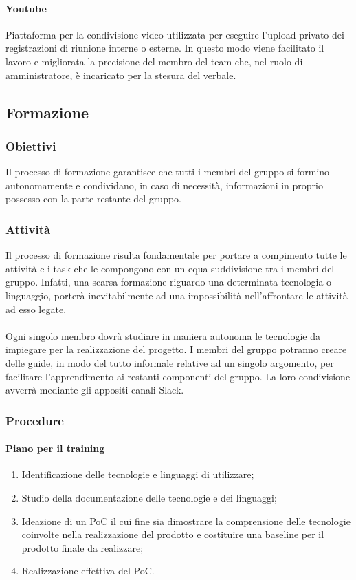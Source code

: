 	\paragraph{Youtube}
	Piattaforma per la condivisione video utilizzata per eseguire l'upload privato dei registrazioni di riunione interne o esterne. In questo modo viene facilitato il lavoro e migliorata la precisione del membro del team che, nel ruolo di amministratore, è incaricato per la stesura del verbale.


   	\subsection{Formazione}
	\subsubsection{Obiettivi}
	Il processo di formazione garantisce che tutti i membri del gruppo si formino autonomamente e condividano, in caso di necessità, informazioni in proprio possesso con la parte restante del gruppo.

	\subsubsection{Attività}
	Il processo di formazione risulta fondamentale per portare a compimento tutte le attività e i task che le compongono con un equa suddivisione tra i membri del gruppo. Infatti, una scarsa formazione riguardo una determinata tecnologia o linguaggio, porterà inevitabilmente ad una impossibilità nell'affrontare le attività ad esso legate.\\\\
	Ogni singolo membro dovrà studiare in maniera autonoma le tecnologie da impiegare per la realizzazione del progetto. I membri del gruppo potranno creare delle guide, in modo del tutto informale relative ad un singolo argomento, per facilitare l'apprendimento ai restanti componenti del gruppo. La loro condivisione avverrà mediante gli appositi canali Slack.

	\subsubsection{Procedure}
	\paragraph{Piano per il training}
	\begin{enumerate}
		\item Identificazione delle tecnologie e linguaggi di utilizzare;
		\item Studio della documentazione delle tecnologie e dei linguaggi;
		\item Ideazione di un PoC il cui fine sia dimostrare la comprensione delle tecnologie coinvolte nella realizzazione del prodotto e costituire una baseline per il prodotto finale da realizzare;
		\item Realizzazione effettiva del PoC.
	\end{enumerate}

